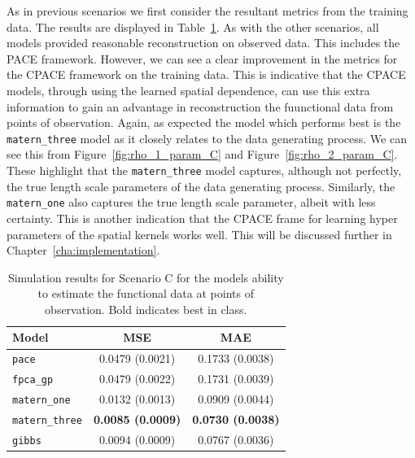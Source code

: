 As in previous scenarios we first consider the resultant metrics from the training data.
The results are displayed in Table~\ref{tab:train_C}.
As with the other scenarios, all models provided reasonable reconstruction on observed data.
This includes the PACE framework.
However, we can see a clear improvement in the metrics for the CPACE framework on the training data.
This is indicative that the CPACE models, through using the learned spatial dependence, can use this extra information to gain an advantage in reconstruction the fuunctional data from points of observation.
Again, as expected the model which performs best is the \verb*|matern_three| model as it closely relates to the data generating process. 
We can see this from Figure~\ref{fig:rho_1_param_C} and Figure~\ref{fig:rho_2_param_C}. 
These highlight that the \verb*|matern_three| model captures, although not perfectly, the true length scale parameters of the data generating process.
Similarly, the \verb*|matern_one| also captures the true length scale parameter, albeit with less certainty.
This is another indication that the CPACE frame for learning hyper parameters of the spatial kernels works well. 
This will be discussed further in Chapter~\ref{cha:implementation}.

\begin{table}
	\caption[Simulation results for Scenario C on observed data.]{Simulation results for Scenario C for the models ability to estimate the functional data at points of observation. Bold indicates best in class.}
	\centering
	\label{tab:train_C}
	\begin{tabular}{lcc}
		\toprule
		\textbf{Model} & \textbf{MSE} & \textbf{MAE} \\
		\midrule
		\verb*|pace| & 0.0479 (0.0021)& 0.1733	(0.0038)\\
		\verb*|fpca_gp| & 0.0479 (0.0022) & 0.1731	(0.0039) \\
		\verb*|matern_one| & 0.0132	(0.0013) & 0.0909 (0.0044) \\
		\verb*|matern_three| & \textbf{0.0085 (0.0009)} & \textbf{ 0.0730	(0.0038)} \\
		\verb*|gibbs| & 0.0094	(0.0009) & 0.0767 (0.0036)\\
		\bottomrule
	\end{tabular}
\end{table}

